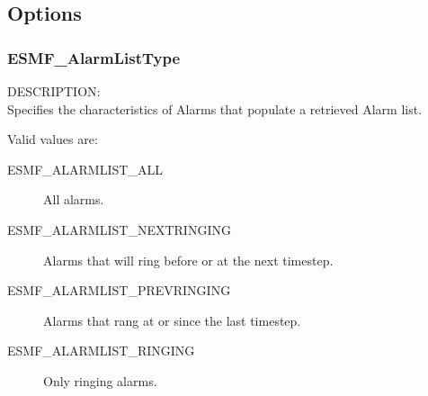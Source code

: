 
\subsection{Options}

\subsubsection{ESMF\_AlarmListType}

{\sf DESCRIPTION:\\}
Specifies the characteristics of Alarms that populate
a retrieved Alarm list.

Valid values are:
\begin{description}

\item [ESMF\_ALARMLIST\_ALL] 
      All alarms.

\item [ESMF\_ALARMLIST\_NEXTRINGING] 
      Alarms that will ring before or at the next timestep.

\item [ESMF\_ALARMLIST\_PREVRINGING] 
      Alarms that rang at or since the last timestep.

\item [ESMF\_ALARMLIST\_RINGING] 
      Only ringing alarms.

\end{description}

